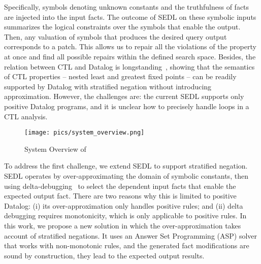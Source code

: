 Specifically, symbols denoting unknown constants and the truthfulness of facts are injected into the input facts. 
The outcome of SEDL on these symbolic inputs summarizes the logical constraints over the symbols that enable the output.
Then, any valuation of symbols that produces the desired query output corresponds to a patch.
This allows us to repair all the violations of the property at once and find all possible repairs within the defined search space.
Besides, the relation between CTL and Datalog is longstanding~\cite{gottlob2002datalog}, showing that the semantics of CTL properties -- nested least and greatest fixed points -- can be readily supported by Datalog with stratified negation without introducing approximation.
However, the challenges are: the current SEDL supports only positive Datalog programs, and it is unclear how to precisely handle loops in a CTL analysis. 

\begin{figure*}
\centering
\texttt{[image: pics/system\_overview.png]}
\caption{\label{fig:Verification_overview}System Overview of \toolName}
\vspace{-1mm}
\end{figure*}


To address the first challenge, we extend SEDL to support stratified negation. SEDL operates by over-approximating the domain of symbolic constants, then using delta-debugging~\cite{zeller1999yesterday} to select the dependent input facts that enable the expected output fact. 
There are two reasons why this is limited to positive Datalog: (i) its over-approximation only handles positive rules; and (ii) delta debugging requires monotonicity, which is only applicable to positive rules.
In this work, we propose a new solution in which the over-approximation takes account of stratified negations. It uses an Answer Set Programming (ASP) solver that works with non-monotonic rules, and the generated fact modifications are sound by construction, \ie they lead to the expected output results. 




